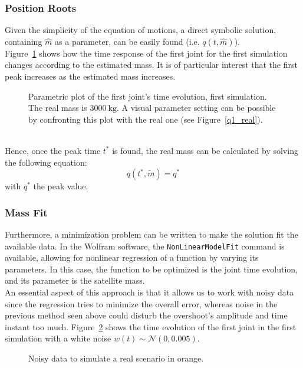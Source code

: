 \documentclass[a4paper,12pt,oneside]{report}
\begin{document}
\subsubsection{Position Roots}
Given the simplicity of the equation of motions, a direct symbolic solution, containing $\hat{m}$ as a parameter, can be easily found (i.e. $q(t,\hat{m})$).\\
Figure~\ref{parametric_plot} shows how the time response of the first joint for the first simulation changes according to the estimated mass. It is of particular interest that the first peak increases as the estimated mass increases.
\begin{figure}[h]
  \centering
  
  \caption{Parametric plot of the first joint's time evolution, first simulation. The real mass is $\SI{3000}{\kilogram}$. A visual parameter setting can be possible by confronting this plot with the real one (see Figure~\ref{q1_real}).}
  \label{parametric_plot}
\end{figure}\\
Hence, once the peak time $t^*$ is found, the real mass can be calculated by solving the following equation:
\begin{equation}
  q(t^*,\tilde{m})=q^*
\end{equation}
with $q^*$ the peak value.
\subsubsection{Mass Fit}
Furthermore, a minimization problem can be written to make the solution fit the available data. In the Wolfram software, the \texttt{NonLinearModelFit} command is available, allowing for nonlinear regression of a function by varying its parameters. In this case, the function to be optimized is the joint time evolution, and its parameter is the satellite mass.\\
An essential aspect of this approach is that it allows us to work with noisy data since the regression tries to minimize the overall error, whereas noise in the previous method seen above could disturb the overshoot's amplitude and time instant too much. Figure~\ref{noise} shows the time evolution of the first joint in the first simulation with a white noise $w(t)\sim \mathcal{N} (0,0.005)$.
\begin{figure}[h]
  \centering
  
  \caption{Noisy data to simulate a real scenario in orange.}
  \label{noise}
\end{figure}
\newpage
\end{document}
